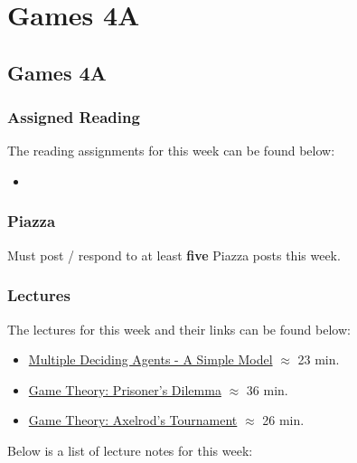 \clearpage

\renewcommand{\ChapTitle}{Games 4A}
\renewcommand{\SectionTitle}{Games 4A}

\chapter{\ChapTitle}
\section{\SectionTitle}

\subsection{Assigned Reading}

The reading assignments for this week can be found below:

\begin{itemize}
    \item {}
\end{itemize}

\subsection{Piazza}

Must post / respond to at least \textbf{five} Piazza posts this week.  

\subsection{Lectures}

The lectures for this week and their links can be found below:

\begin{itemize}
    \item \href{https://www.youtube.com/watch?v=JDg9Z2W9Mfk}{Multiple Deciding Agents - A Simple Model} $\approx$ 23 min.
    \item \href{https://www.youtube.com/watch?v=6rD16HNCs50}{Game Theory: Prisoner's Dilemma} $\approx$ 36 min.
    \item \href{https://www.youtube.com/watch?v=5D5huKHZgu0}{Game Theory: Axelrod's Tournament} $\approx$ 26 min.
\end{itemize}

\noindent Below is a list of lecture notes for this week:

